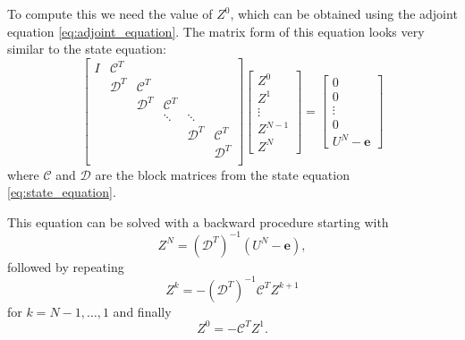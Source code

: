 \documentclass[utf8,english]{gradu3}
\begin{document}
To compute this we need the value of $Z^0$,
which can be obtained using the adjoint equation \eqref{eq:adjoint_equation}.
The matrix form of this equation looks very similar to the state equation:
\begin{equation}\label{eq:adjoint_equation_matrix}
  \begin{bmatrix}
    I & \mathcal{C}^T \\
    & \mathcal{D}^T & \mathcal{C}^T \\
    & & \mathcal{D}^T & \mathcal{C}^T \\
    & & & \ddots & \ddots \\
    & & & & \mathcal{D}^T & \mathcal{C}^T \\
    & & & & & \mathcal{D}^T \\
  \end{bmatrix}
  \begin{bmatrix}
    Z^0 \\ Z^1 \\ \vdots \\ Z^{N-1} \\ Z^N
  \end{bmatrix}
  = \begin{bmatrix}
    0 \\ 0 \\ \vdots \\ 0 \\ U^N - \mathbf{e}
  \end{bmatrix}
\end{equation}
where $\mathcal{C}$ and $\mathcal{D}$ are the block matrices
from the state equation \eqref{eq:state_equation}.

This equation can be solved with a backward procedure starting with
\begin{equation}\label{eq:adjoint_sim_start}
  Z^N = (\mathcal{D}^T)^{-1} (U^N - \mathbf{e}),
\end{equation}
followed by repeating
\begin{equation}\label{eq:adjoint_sim_step}
  Z^k = -(\mathcal{D}^T)^{-1} \mathcal{C}^T Z^{k+1}
\end{equation}
for $k = N-1, \dots, 1$ and finally
\begin{equation}\label{eq:adjoint_sim_final}
  Z^0 = -\mathcal{C}^T Z^1.
\end{equation}
\end{document}
